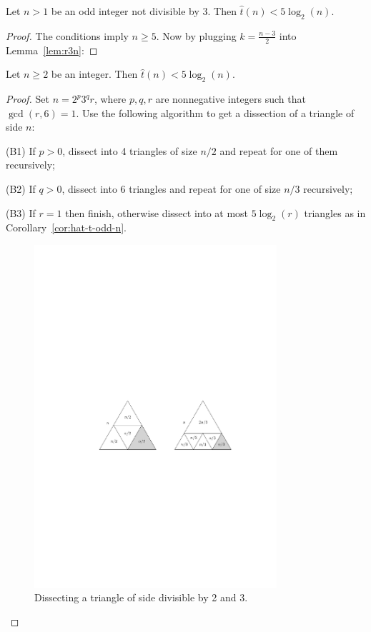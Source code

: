 \begin{cor}
\label{cor:hat-t-odd-n}
Let $n > 1$ be an odd integer not divisible by 3. Then $\hat t(n) < 5\log_2(n)$.
\end{cor}
\begin{proof}
The conditions imply $n \geq 5$. Now by plugging $k = \frac{n-3}{2}$ into Lemma~\ref{lem:r3n}:
\end{proof}


\begin{thm}
\label{thm:t-log-bound}
Let $n \geq 2$ be an integer. Then $\hat t(n) < 5\log_2(n)$.
\end{thm}
\begin{proof}

Set $n = 2^p3^qr$, where $p,q,r$ are nonnegative integers such that $\gcd(r,6) = 1$. Use the following algorithm to get a dissection of a triangle of side $n$:

\begin{cosyenumerate}
	\item[(B1)] If $p > 0$, dissect into 4 triangles of size $n/2$ and repeat for one of them recursively;
	\item[(B2)] If $q > 0$, dissect into 6 triangles and repeat for one of size $n/3$ recursively;
	\item[(B3)] If $r=1$ then finish, otherwise dissect into at most $5\log_2(r)$ triangles as in Corollary~\ref{cor:hat-t-odd-n}.
\end{cosyenumerate}

\begin{figure}[htb]
\centering
\includegraphics[width=0.8\textwidth]{img/triangle23.pdf}
\caption{Dissecting a triangle of side divisible by 2 and 3.}
\label{fig:triangle23}
\end{figure}


\end{proof}
